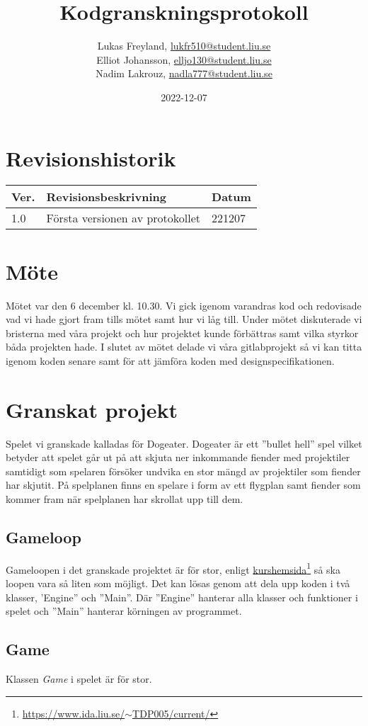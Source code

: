 \documentclass[12pt]{TDP005mall}
\author{Lukas Freyland, \url{lukfr510@student.liu.se}\\
  Elliot Johansson, \url{elljo130@student.liu.se}\\
  Nadim Lakrouz, \url{nadla777@student.liu.se}}
\title{Kodgranskningsprotokoll}
\date{2022-12-07}
\begin{document}
\projectpage
\section{Revisionshistorik}
\begin{table}[!h]
\begin{tabularx}{\linewidth}{|l|X|l|}
\hline
Ver. & Revisionsbeskrivning & Datum \\\hline
1.0 & Första versionen av protokollet & 221207 \\\hline
\end{tabularx}
\end{table}


\section{Möte}
Mötet var den 6 december kl. 10.30. Vi gick igenom varandras kod och redovisade vad vi hade gjort fram tills mötet samt hur vi låg till. Under mötet diskuterade vi bristerna med våra projekt och hur projektet kunde förbättras samt vilka styrkor båda projekten hade. I slutet av mötet delade vi våra gitlabprojekt så vi kan titta igenom koden senare samt för att jämföra koden med designspecifikationen.

\section{Granskat projekt}
Spelet vi granskade kalladas för Dogeater. Dogeater är ett ''bullet hell'' spel vilket betyder att spelet går ut på att skjuta ner inkommande fiender med projektiler samtidigt som spelaren försöker undvika en stor mängd av projektiler som fiender har skjutit. På spelplanen finns en spelare i form av ett flygplan samt fiender som kommer fram när spelplanen har skrollat upp till dem. 

\subsection{Gameloop}
Gameloopen i det granskade projektet är för stor, enligt \href{https://www.ida.liu.se/~TDP005/current/}{kurshemsida}\footnote{\href{https://www.ida.liu.se/~TDP005/current/}{https://www.ida.liu.se/\(\sim\)TDP005/current/}} så ska loopen vara så liten som möjligt. Det kan lösas genom att dela upp koden i två klasser, 'Engine'' och ''Main''. Där ''Engine'' hanterar alla klasser och funktioner i spelet och ''Main'' hanterar körningen av programmet. 

\subsection{Game}
Klassen \textit{Game} i spelet är för stor. 
\end{document}

